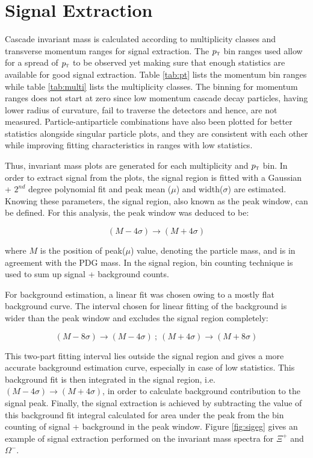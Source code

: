 \section{Signal Extraction}
Cascade invariant mass is calculated according to multiplicity classes and transverse momentum ranges for signal extraction. The $p_{\textnormal{\sc t}}$
bin ranges used allow for a spread of $p_{\textnormal{\sc t}}$ to be observed yet making sure that enough statistics are available for good signal extraction.
Table \ref{tab:pt} lists the momentum bin ranges while table \ref{tab:multi} lists the multiplicity classes. The binning for momentum ranges does not start
at zero since low momentum cascade decay particles, having lower radius of curvature, fail to traverse the detectors and hence, are not measured.
Particle-antiparticle
combinations have also been plotted for better statistics alongside singular particle plots, and  they are consistent with each other while improving
fitting characteristics in ranges with low statistics.

Thus, invariant mass plots are generated for each multiplicity and $p_{\textnormal{\sc t}}$ bin. In order to extract signal from the plots, the signal
region is fitted with a Gaussian + $2^{nd}$ degree polynomial fit and peak mean ($\mu$) and width($\sigma$) are estimated. Knowing these parameters,
the signal region, also known as the peak window, can be defined. For this analysis, the peak window was deduced to be:

\begin{equation}
    (M-4\sigma) \to (M+4\sigma)
\end{equation}


where $M$ is the position of peak($\mu$) value, denoting the particle mass, and is in agreement with the PDG mass. In the signal region, bin counting
technique is used to sum up signal + background counts.

For background estimation, a linear fit was chosen owing to a mostly flat background curve. The interval chosen for linear fitting of the background is
wider than the peak window and excludes the signal region completely:

\begin{equation}
    (M-8\sigma) \to (M-4\sigma) \  ; \    (M+4\sigma) \to (M+8\sigma)
\end{equation}

This two-part fitting interval lies outside the signal region and gives a more accurate background estimation curve, especially in case of low statistics.
This background fit is then integrated in the signal region, i.e. $(M-4\sigma) \to (M+4\sigma)$, in order to calculate background contribution
to the signal peak. Finally, the signal extraction is achieved by subtracting the value of this background fit integral calculated for area under the peak
from the bin counting of signal + background in the peak window. Figure \ref{fig:sigeg} gives an example of signal extraction performed on the invariant
mass spectra for $\Xi^{+}$ and $\Omega^{-}$.

